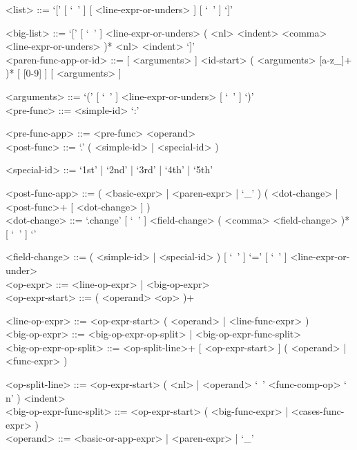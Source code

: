 \documentclass{article}
\begin{document}
\begin{grammar}
<list> ::= `[' [ `\ ' ] [ <line-expr-or-unders> ] [ `\ ' ] `]'

<big-list> ::=
`[' [ `\ ' ] <line-expr-or-unders>
( <nl> <indent> <comma> <line-expr-or-unders> )* <nl> <indent> `]'
\\

<paren-func-app-or-id> ::=
[ <arguments> ] <id-start> ( <arguments> [a-z_]+ )* [ [0-9] ]
[ <arguments> ]

<arguments> ::= `(' [ `\ ' ] <line-expr-or-unders> [ `\ ' ] `)'
\\

\newpage
<pre-func> ::= <simple-id> `:'

<pre-func-app> ::= <pre-func> <operand>
\\

<post-func> ::= `.' ( <simple-id> | <special-id> )

<special-id> ::= `1st' | `2nd' | `3rd' | `4th' | `5th'

<post-func-app> ::=
( <basic-expr> | <paren-expr> | `_' )
( <dot-change> | <post-func>+ [ <dot-change> ] )
\\

<dot-change> ::=
`.change{' [ `\ ' ] <field-change> ( <comma> <field-change> )* [ `\ ' ] `}'

<field-change> ::=
( <simple-id> | <special-id> ) [ `\ ' ] `=' [ `\ ' ] <line-expr-or-under>
\\

<op-expr> ::= <line-op-expr> | <big-op-expr>
\\

<op-expr-start> ::= ( <operand> <op> )+

<line-op-expr> ::= <op-expr-start> ( <operand> | <line-func-expr> )
\\

<big-op-expr> ::=
<big-op-expr-op-split> | <big-op-expr-func-split>
\\

<big-op-expr-op-split> ::=
<op-split-line>+ [ <op-expr-start> ] ( <operand> | <func-expr> )

<op-split-line> ::=
<op-expr-start> ( <nl> | <operand> `\ ' <func-comp-op> `\\n' ) <indent>
\\

<big-op-expr-func-split> ::=
<op-expr-start> ( <big-func-expr> | <cases-func-expr> )
\\

<operand> ::= <basic-or-app-expr> | <paren-expr> | `_'
\\


\end{grammar}
\end{document}
